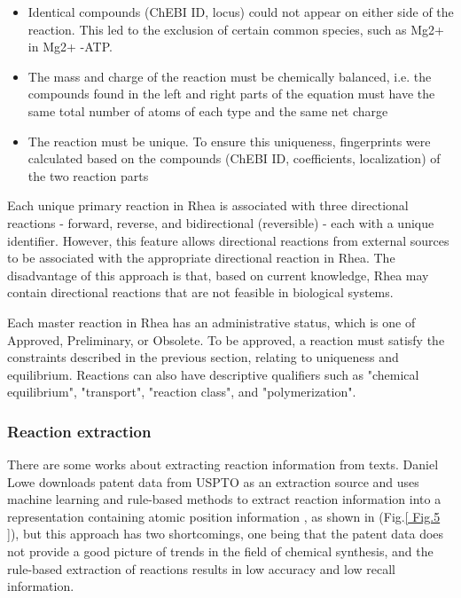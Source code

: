 \documentclass[%
 aip,
 jmp,%
 amsmath,amssymb,
 reprint,%
]{revtex4-2}
\begin{document}
\begin{itemize}
    \item Identical compounds (ChEBI ID, locus) could not appear on either side of the reaction. This led to the exclusion of certain common species, such as Mg2+ in Mg2+ -ATP.
    \item The mass and charge of the reaction must be chemically balanced, i.e. the compounds found in the left and right parts of the equation must have the same total number of atoms of each type and the same net charge
    \item The reaction must be unique. To ensure this uniqueness, fingerprints were calculated based on the compounds (ChEBI ID, coefficients, localization) of the two reaction parts
\end{itemize}

Each unique primary reaction in Rhea is associated with three directional reactions - forward, reverse, and bidirectional (reversible) - each with a unique identifier. However, this feature allows directional reactions from external sources to be associated with the appropriate directional reaction in Rhea. The disadvantage of this approach is that, based on current knowledge, Rhea may contain directional reactions that are not feasible in biological systems.

Each master reaction in Rhea has an administrative status, which is one of Approved, Preliminary, or Obsolete. To be approved, a reaction must satisfy the constraints described in the previous section, relating to uniqueness and equilibrium. Reactions can also have descriptive qualifiers such as "chemical equilibrium", "transport", "reaction class", and "polymerization".

\subsubsection{Reaction extraction}

There are some works about extracting reaction information from texts. Daniel Lowe downloads patent data from USPTO as an extraction source and uses machine learning and rule-based methods to extract reaction information into a representation containing atomic position information \cite{lowe2012extraction}, as shown in (Fig.\ref{ Fig.5 }), but this approach has two shortcomings, one being that the patent data does not provide a good picture of trends in the field of chemical synthesis, and the rule-based extraction of reactions results in low accuracy and low recall information.
\end{document}
